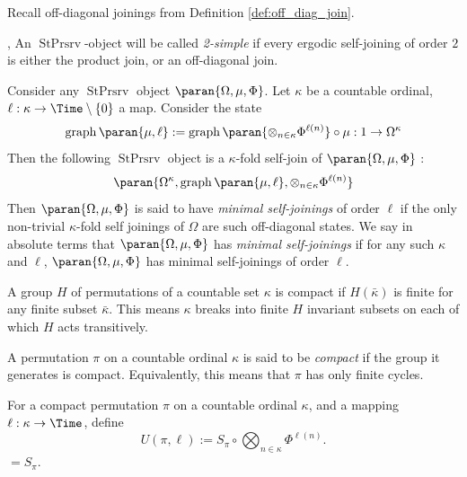 \documentclass[12pt,oneside,pb-diagram]{article}
\DeclareMathOperator{\sps}{StPrsrv}
\DeclareMathOperator{\graph}{graph}
\begin{document}
Recall off-diagonal joinings from Definition \ref{def:off_diag_join}.

\begin{definition} 
	\cite[Sec 6.1]{glasner2015join}, \cite{Rudolph1979join} An $\sps$-object will be called \emph{2-simple} if every ergodic self-joining of order $2$ is either the product join, or an off-diagonal join.
\end{definition}

\begin{definition} 
	\cite[pg 2]{Rudolph1979join} Consider any $\sps$ object $\paran{ \Omega, \mu, \Phi }$. Let $\kappa$ be a countable ordinal, $\ell : \kappa \to \Time \setminus \{0\}$ a map. Consider the state
	\[ \graph \paran{ \mu, \ell } := \graph\paran{ \otimes_{n\in\kappa} \Phi^{\ell(n)} } \circ \mu : 1 \to \Omega^{\kappa} \]
	Then the following $\sps$ object is a $\kappa$-fold self-join of $\paran{ \Omega, \mu, \Phi }$ : 
	\[ \paran{ \Omega^{\kappa}, \graph \paran{ \mu, \ell } , \otimes_{n\in\kappa} \Phi^{\ell(n)} } \]
	Then $\paran{ \Omega, \mu, \Phi }$ is said to have \emph{minimal self-joinings} of order $\ell$ if the only non-trivial $\kappa$-fold self joinings of $\Omega$ are such off-diagonal states. We say in absolute terms that $\paran{ \Omega, \mu, \Phi }$ has \emph{minimal self-joinings} if for any such $\kappa$ and $\ell$, $\paran{ \Omega, \mu, \Phi }$ has minimal self-joinings of order $\ell$.
\end{definition}

\begin{definition} 
	\cite[pg 14]{Rudolph1979join} A group $H$ of permutations of a countable set $\kappa$ is compact if $H(\bar{\kappa})$ is finite for any finite subset $\bar{\kappa}$. This means $\kappa$ breaks into finite $H$ invariant subsets on each of which $H$ acts transitively.
\end{definition}

\begin{definition} 
	\cite[pg 14]{Rudolph1979join} A permutation $\pi$ on a countable ordinal $\kappa$ is said to be \textit{compact} if the group it generates is compact. Equivalently, this means that $\pi$ has only finite cycles. 
\end{definition}

For a compact permutation $\pi$  on a countable ordinal $\kappa$, and a mapping $\ell : \kappa \to \Time$, define
%
\[ U(\pi, \ell) := S_{\pi} \circ \bigotimes_{n \in \kappa} \Phi^{\ell(n)} .\]
%
$ = S_\pi $. %
\end{document}
